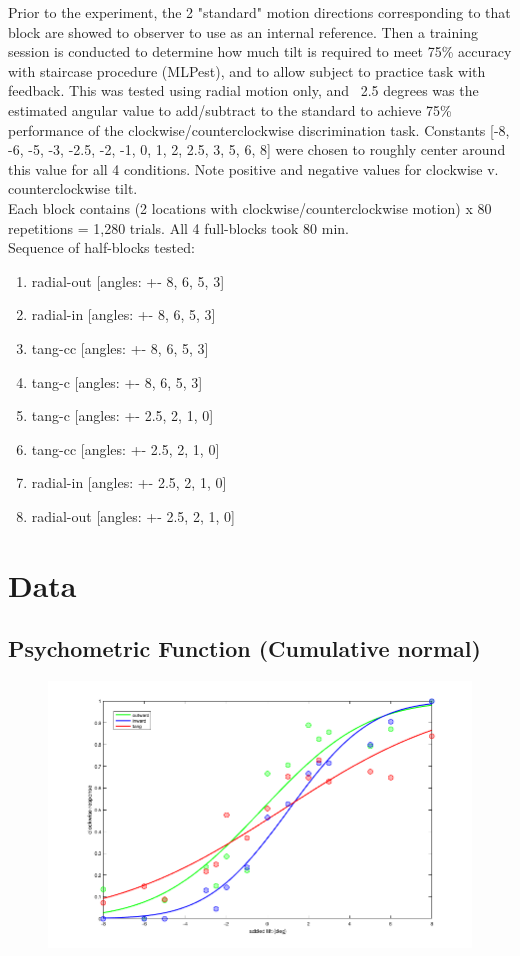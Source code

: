 \documentclass[11pt]{article} %
\begin{document}
Prior to the experiment, the 2 "standard" motion directions corresponding to that block are showed to observer to use as an internal reference. Then a training session is conducted to determine how much tilt is required to meet 75\% accuracy with staircase procedure (MLPest), and to allow subject to practice task with feedback. This was tested using radial motion only, and ~2.5 degrees was the estimated angular value to add/subtract to the standard to achieve 75\% performance of the clockwise/counterclockwise discrimination task. Constants [-8, -6, -5, -3, -2.5, -2, -1, 0, 1, 2, 2.5, 3, 5, 6, 8] were chosen to roughly center around this value for all 4 conditions. Note positive and negative values for clockwise v. counterclockwise tilt.
\\
Each block contains (2 locations with clockwise/counterclockwise motion) x 80 repetitions = 1,280 trials. All 4 full-blocks took 80 min. 
\\
Sequence of half-blocks tested: 
\begin{enumerate}
\item radial-out [angles: +- 8, 6, 5, 3]
\item radial-in [angles: +- 8, 6, 5, 3]
\item tang-cc [angles: +- 8, 6, 5, 3]
\item tang-c [angles: +- 8, 6, 5, 3]
\item tang-c [angles: +- 2.5, 2, 1, 0]
\item tang-cc [angles: +- 2.5, 2, 1, 0]
\item radial-in [angles: +- 2.5, 2, 1, 0]
\item radial-out [angles: +- 2.5, 2, 1, 0]
\end{enumerate}

\section{Data}
\subsection{Psychometric Function (Cumulative normal)}
\begin{figure}[H]
\centering %
\includegraphics[scale=.4]{Images/PF_angles.png}
\end{figure}
\end{document}
